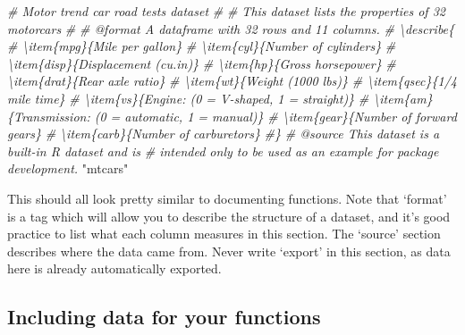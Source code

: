 \documentclass[
]{book}
\newenvironment{Shaded}{\begin{snugshade}}{\end{snugshade}}
\newcommand{\CommentTok}[1]{\textcolor[rgb]{0.56,0.35,0.01}{\textit{#1}}}
\newcommand{\StringTok}[1]{\textcolor[rgb]{0.31,0.60,0.02}{#1}}
\begin{document}
\begin{Shaded}
\begin{Highlighting}[]
\CommentTok{\#\textquotesingle{} Motor trend car road tests dataset}
\CommentTok{\#\textquotesingle{}}
\CommentTok{\#\textquotesingle{} This dataset lists the properties of 32 motorcars}
\CommentTok{\#\textquotesingle{}}
\CommentTok{\#\textquotesingle{} @format A dataframe with 32 rows and 11 columns.}
\CommentTok{\#\textquotesingle{} \textbackslash{}describe\{}
\CommentTok{\#\textquotesingle{}   \textbackslash{}item\{mpg\}\{Mile per gallon\}}
\CommentTok{\#\textquotesingle{}   \textbackslash{}item\{cyl\}\{Number of cylinders\}}
\CommentTok{\#\textquotesingle{}   \textbackslash{}item\{disp\}\{Displacement (cu.in)\}}
\CommentTok{\#\textquotesingle{}   \textbackslash{}item\{hp\}\{Gross horsepower\}}
\CommentTok{\#\textquotesingle{}   \textbackslash{}item\{drat\}\{Rear axle ratio\}}
\CommentTok{\#\textquotesingle{}   \textbackslash{}item\{wt\}\{Weight (1000 lbs)\}}
\CommentTok{\#\textquotesingle{}   \textbackslash{}item\{qsec\}\{1/4 mile time\}}
\CommentTok{\#\textquotesingle{}   \textbackslash{}item\{vs\}\{Engine: (0 = V{-}shaped, 1 = straight)\}}
\CommentTok{\#\textquotesingle{}   \textbackslash{}item\{am\}\{Transmission: (0 = automatic, 1 = manual)\}}
\CommentTok{\#\textquotesingle{}   \textbackslash{}item\{gear\}\{Number of forward gears\}}
\CommentTok{\#\textquotesingle{}   \textbackslash{}item\{carb\}\{Number of carburetors\}}
\CommentTok{\#\textquotesingle{}\}}
\CommentTok{\#\textquotesingle{} @source This dataset is a built{-}in R dataset and is}
\CommentTok{\#\textquotesingle{} intended only to be used as an example for package development.}
\StringTok{"mtcars"}
\end{Highlighting}
\end{Shaded}

This should all look pretty similar to documenting functions. Note that `format' is a tag which will allow you to describe the structure of a dataset, and it's good practice to list what each column measures in this section. The `source' section describes where the data came from. Never write `export' in this section, as data here is already automatically exported.

\hypertarget{including-data-for-your-functions}{%
\subsection{Including data for your functions}\label{including-data-for-your-functions}}
\end{document}
